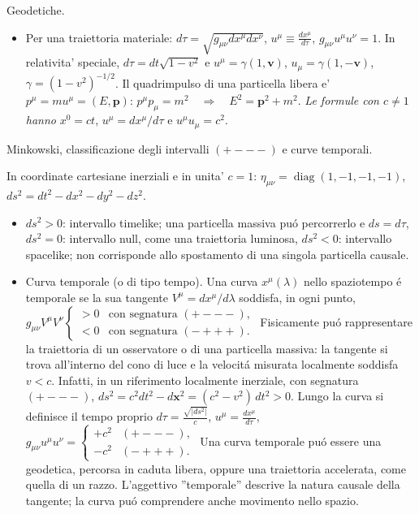 \begin{frame}[t]{Geodetiche.}
\begin{itemize}
\item {\footnotesize Per una traiettoria materiale: $d\tau=\sqrt{g_{\mu\nu}dx^\mu dx^\nu}$, $u^\mu\equiv\frac{dx^\mu}{d\tau}$, $g_{\mu\nu}u^\mu u^\nu=1$. In relativita' speciale, $d\tau=dt\sqrt{1-v^2}$ e $u^\mu=\gamma(1,\mathbf v)$, $u_\mu=\gamma(1,-\mathbf v)$, $\gamma=(1-v^2)^{-1/2}$.
Il quadrimpulso di una particella libera e' $p^\mu=mu^\mu=(E,\mathbf p)$: $p^\mu p_\mu=m^2\quad\Longrightarrow\quad E^2=\mathbf p^2+m^2$.
\textit{Le formule con $c\ne1$ hanno} $x^0=ct$, $u^\mu=dx^\mu/d\tau$ e $u^\mu u_\mu=c^2$.\par}
\end{itemize}
\end{frame}

\begin{frame}[t]{Minkowski, classificazione degli intervalli $(+---)$ e curve temporali.}\small\raggedright
In coordinate cartesiane inerziali e in unita' $c=1$: $\eta_{\mu\nu}=\operatorname{diag}(1,-1,-1,-1)$, $ds^2=dt^2-dx^2-dy^2-dz^2$.
\begin{itemize}
\item $ds^2>0$: intervallo timelike; una particella massiva pu\'o percorrerlo e $ds=d\tau$, $ds^2=0$: intervallo null, come una traiettoria luminosa, $ds^2<0$: intervallo spacelike; non corrisponde allo spostamento di una singola particella causale.
    \item Curva temporale (o di tipo tempo). Una curva $x^\mu(\lambda)$ nello spaziotempo \'e temporale se la sua
tangente $V^\mu=dx^\mu/d\lambda$ soddisfa, in ogni punto, $g_{\mu\nu}V^\mu V^\nu
\begin{cases}
>0 & \text{con segnatura }(+---),\\
<0 & \text{con segnatura }(-+++).
\end{cases}$
Fisicamente pu\'o rappresentare la traiettoria di un osservatore o di una particella massiva: la tangente si trova all'interno
del cono di luce e la velocit\'a misurata localmente soddisfa $v<c$. Infatti, in un riferimento localmente inerziale, con segnatura $(+---)$, $ds^2=c^2dt^2-d\mathbf{x}^2=(c^2-v^2)\,dt^2>0$. Lungo la curva si definisce il tempo proprio $d\tau=\frac{\sqrt{|ds^2|}}{c}$, $u^\mu=\frac{dx^\mu}{d\tau}$, $g_{\mu\nu}u^\mu u^\nu=\begin{cases}
+c^2 & (+---),\\
-c^2 & (-+++).
\end{cases}$
Una curva temporale pu\'o essere una geodetica, percorsa in caduta libera, oppure una traiettoria accelerata, come quella di un razzo. L'aggettivo ''temporale'' descrive la natura causale della tangente; la curva pu\'o comprendere anche movimento nello spazio.
\end{itemize}
\end{frame}

